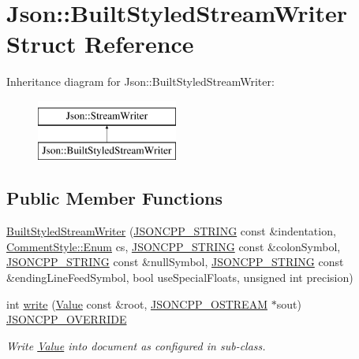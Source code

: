 \hypertarget{structJson_1_1BuiltStyledStreamWriter}{}\section{Json\+:\+:Built\+Styled\+Stream\+Writer Struct Reference}
\label{structJson_1_1BuiltStyledStreamWriter}
Inheritance diagram for Json\+:\+:Built\+Styled\+Stream\+Writer\+:\begin{figure}[H]
\begin{center}
\leavevmode
\includegraphics[height=2.000000cm]{structJson_1_1BuiltStyledStreamWriter}
\end{center}
\end{figure}
\subsection*{Public Member Functions}
\begin{DoxyCompactItemize}
\item 
\hyperlink{structJson_1_1BuiltStyledStreamWriter_adf11b7d1ee3c68d096b7c662ee85948e}{Built\+Styled\+Stream\+Writer} (\hyperlink{json_8hpp_a1e723f95759de062585bc4a8fd3fa4be}{J\+S\+O\+N\+C\+P\+P\+\_\+\+S\+T\+R\+I\+NG} const \&indentation, \hyperlink{structJson_1_1CommentStyle_a51fc08f3518fd81eba12f340d19a3d0c}{Comment\+Style\+::\+Enum} cs, \hyperlink{json_8hpp_a1e723f95759de062585bc4a8fd3fa4be}{J\+S\+O\+N\+C\+P\+P\+\_\+\+S\+T\+R\+I\+NG} const \&colon\+Symbol, \hyperlink{json_8hpp_a1e723f95759de062585bc4a8fd3fa4be}{J\+S\+O\+N\+C\+P\+P\+\_\+\+S\+T\+R\+I\+NG} const \&null\+Symbol, \hyperlink{json_8hpp_a1e723f95759de062585bc4a8fd3fa4be}{J\+S\+O\+N\+C\+P\+P\+\_\+\+S\+T\+R\+I\+NG} const \&ending\+Line\+Feed\+Symbol, bool use\+Special\+Floats, unsigned int precision)
\item 
int \hyperlink{structJson_1_1BuiltStyledStreamWriter_a823cdb1afabb6b0d5f39bcd5a6a6f747}{write} (\hyperlink{classJson_1_1Value}{Value} const \&root, \hyperlink{json_8hpp_a37a25be5fca174927780caeb280094ce}{J\+S\+O\+N\+C\+P\+P\+\_\+\+O\+S\+T\+R\+E\+AM} $\ast$sout) \hyperlink{json_8hpp_a824d6199c91488107e443226fa6022c5}{J\+S\+O\+N\+C\+P\+P\+\_\+\+O\+V\+E\+R\+R\+I\+DE}
\begin{DoxyCompactList}\small\item\em Write \hyperlink{classJson_1_1Value}{Value} into document as configured in sub-\/class. \end{DoxyCompactList}\end{DoxyCompactItemize}
